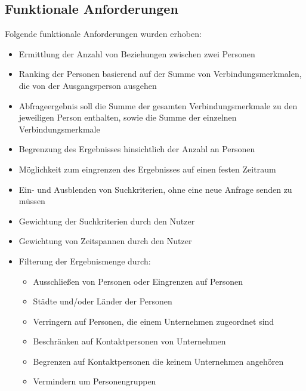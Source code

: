 \subsection{Funktionale Anforderungen}

Folgende funktionale Anforderungen wurden erhoben:

\begin{itemize}
\item Ermittlung der Anzahl von Beziehungen zwischen zwei Personen

\item Ranking der Personen basierend auf der Summe von Verbindungsmerkmalen, die von der Ausgangsperson ausgehen

\item Abfrageergebnis soll die Summe der gesamten Verbindungsmerkmale zu den jeweiligen Person enthalten, sowie die Summe der einzelnen Verbindungsmerkmale

\item Begrenzung des Ergebnisses hinsichtlich der Anzahl an Personen

\item Möglichkeit zum eingrenzen des Ergebnisses auf einen festen Zeitraum

\item Ein- und Ausblenden von Suchkriterien, ohne eine neue Anfrage senden zu müssen

\item Gewichtung der Suchkriterien durch den Nutzer

\item Gewichtung von Zeitspannen durch den Nutzer

\item Filterung der Ergebnismenge durch:	
	\begin{itemize}
	\item Ausschließen von Personen oder Eingrenzen auf Personen
	\item Städte und/oder Länder der Personen
	\item Verringern auf Personen, die einem Unternehmen zugeordnet sind 
	\item Beschränken auf Kontaktpersonen von Unternehmen
	\item Begrenzen auf Kontaktpersonen die keinem Unternehmen angehören
	\item Vermindern um Personengruppen
	\end{itemize}
\end{itemize}

